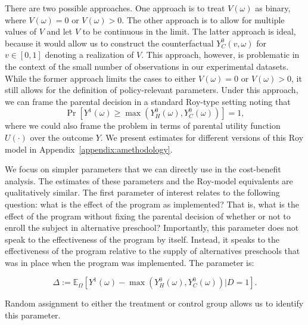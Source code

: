 There are two possible approaches. One approach is to treat $V \left( \omega \right)$ as binary, where $V \left( \omega \right) = 0$ or $V \left( \omega \right)  > 0$. The other approach is to allow for multiple values of $V$ and let $V$ to be continuous in the limit. The latter approach is ideal, because it would allow us to construct the counterfactual $Y_C^0 \left( v,  \omega \right) $ for $v \in [0 , 1]$ denoting a realization of $V$. This approach, however, is problematic in the context of the small number of observations in our experimental datasets. While the former approach limits the cases to either $V \left( \omega \right) = 0$ or $V \left( \omega \right)  > 0$, it still allows for the definition of policy-relevant parameters. Under this approach, we can frame the parental decision in a standard Roy-type setting noting that
\begin{equation}
\Pr \left[ Y^1 \left( \omega \right) \geq \max \left(  Y_{H}^0 \left( \omega \right) ,  Y_{C}^0 \left( \omega \right)   \right) \right] = 1, \label{eq:noutility}
\end{equation}
where we could also frame the problem in terms of parental utility function $U \left( \cdot \right) $ over the outcome $Y$. We present estimates for different versions of this Roy model in Appendix~\ref{appendix:amethodology}.

We focus on simpler parameters that we can directly use in the cost-benefit analysis. The estimates of these parameters and the Roy-model equivalents are qualitatively similar. The first parameter of interest relates to the following question: what is the effect of the program as implemented? That is, what is the effect of the program without fixing the parental decision of whether or not to enroll the subject in alternative preschool? Importantly, this parameter does not speak to the effectiveness of the program by itself. Instead, it speaks to the effectiveness of the program relative to the supply of alternatives preschools that was in place when the program was implemented. The parameter is:

\begin{equation}
\Delta := \mathbb{E}_{\Omega} \left[ Y^1 \left( \omega \right) -  \max \left(  Y_{H}^0 \left( \omega \right) ,  Y_{C}^0 \left( \omega \right)  \right) | D =1 \right]. \label{eq:mainest}
\end{equation}

Random assignment to either the treatment or control group allows us to identify this parameter.

